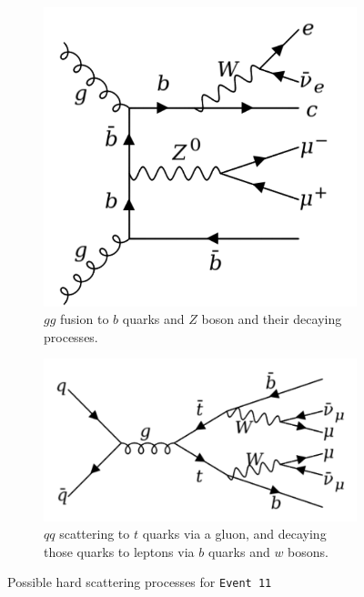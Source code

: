 \begin{figure}[h]
	\begin{subfigure}{0.45\textwidth}
		\includegraphics[width=\textwidth]{../figures/ggFusion.pdf}
		\caption{$gg$ fusion to $b$ quarks and $Z$ boson and their decaying processes.}
    		\label{fig:ggfusion}
	\end{subfigure}
	\hfill
	\begin{subfigure}{0.45\textwidth}
	 	\includegraphics[width=\textwidth]{../figures/qqscattering.pdf}
		\caption{$qq$ scattering to $t$ quarks via a gluon, and decaying those quarks to leptons via $b$ quarks and $w$ bosons.}
		\label{fig:qqscattering}
	\end{subfigure}
	\caption{Possible hard scattering processes for \texttt{Event 11}}
	\label{fig:possibleProc11}
\end{figure}
\FloatBarrier

